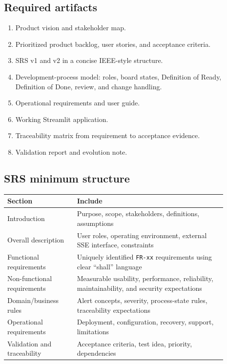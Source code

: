 \documentclass[11pt,a4paper]{article}
\begin{document}
\subsection{Required artifacts}
\begin{enumerate}
\item Product vision and stakeholder map.
\item Prioritized product backlog, user stories, and acceptance criteria.
\item SRS v1 and v2 in a concise IEEE-style structure.
\item Development-process model: roles, board states, Definition of Ready, Definition of Done, review, and change handling.
\item Operational requirements and user guide.
\item Working Streamlit application.
\item Traceability matrix from requirement to acceptance evidence.
\item Validation report and evolution note.
\end{enumerate}

\subsection{SRS minimum structure}
\begin{longtable}{p{0.29\linewidth}p{0.60\linewidth}}
\toprule
\textbf{Section} & \textbf{Include}\\
\midrule
Introduction & Purpose, scope, stakeholders, definitions, assumptions\\
Overall description & User roles, operating environment, external SSE interface, constraints\\
Functional requirements & Uniquely identified \texttt{FR-xx} requirements using clear ``shall'' language\\
Non-functional requirements & Measurable usability, performance, reliability, maintainability, and security expectations\\
Domain/business rules & Alert concepts, severity, process-state rules, traceability expectations\\
Operational requirements & Deployment, configuration, recovery, support, limitations\\
Validation and traceability & Acceptance criteria, test idea, priority, dependencies\\
\bottomrule
\end{longtable}
\end{document}
